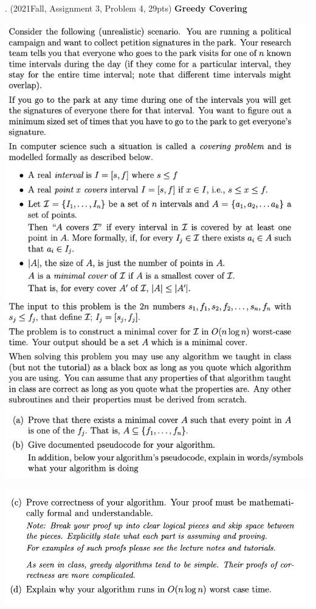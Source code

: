 \begin{spacing}{1.3}
    . (2021Fall, Assignment 3, Problem 4, 29pts) {\bf Greedy Covering}

    \includegraphics[scale=1.05]{images/07-exercise-2021f-hw-question.png}

    \newpage
    \includegraphics[scale=1.05]{images/07-exercise-2021f-hw-question2.png}




\end{spacing}

